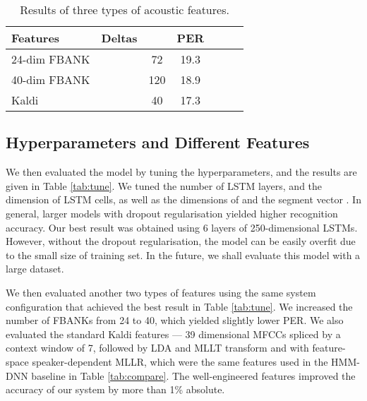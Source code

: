 \documentclass[a4paper]{article}
\begin{document}
\begin{table}
 \centering \small
\caption{Results of three types of acoustic features. }\vskip 1.5mm
\label{tab:feautre}
\begin{tabular}{l|cccccc}
\hline

\hline
Features  & Deltas &  & PER  \\ \hline
 24-dim FBANK &  & 72 & 19.3 \\
 40-dim FBANK &  & 120 & 18.9 \\
 Kaldi &  & 40 &  17.3 \\ 
 \hline

\hline
\end{tabular}
\vskip-5mm
\end{table}

\subsection{Hyperparameters and Different Features}

We then evaluated the model by tuning the hyperparameters, and the results are given in Table \ref{tab:tune}. We tuned the number of LSTM layers, and the dimension of LSTM cells, as well as the dimensions of  and the segment vector . In general, larger models with dropout regularisation yielded higher recognition accuracy. Our best result was obtained using 6 layers of 250-dimensional LSTMs. However, without the dropout regularisation, the model can be easily overfit due to the small size of training set. In the future, we shall evaluate this model with a large dataset. 

We then evaluated another two types of features using the same system configuration that achieved the best result in Table \ref{tab:tune}. We increased the number of FBANKs from 24 to 40, which yielded slightly lower PER. We also evaluated the standard Kaldi features --- 39 dimensional MFCCs spliced by a context window of 7, followed by LDA and MLLT transform and with feature-space speaker-dependent MLLR, which were the same features used in the HMM-DNN baseline in Table \ref{tab:compare}. The well-engineered features improved the accuracy of our system by more than 1\% absolute.
\end{document}
